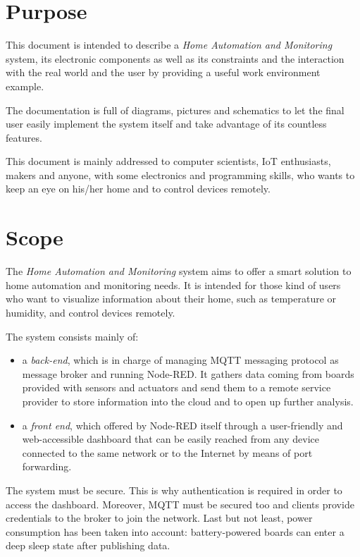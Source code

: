 \section{Purpose}
This document is intended to describe a \textit{Home Automation and Monitoring} system, its electronic components as well as its constraints and the interaction with the real world and the user by providing a useful work environment example.

The documentation is full of diagrams, pictures and schematics to let the final user easily implement the system itself and take advantage of its countless features.

This document is mainly addressed to computer scientists, IoT enthusiasts, makers and anyone, with some electronics and programming skills, who wants to keep an eye on his/her home and to control devices remotely.

\section{Scope}
The \textit{Home Automation and Monitoring} system aims to offer a smart solution to home automation and monitoring needs. It is intended for those kind of users who want to visualize information about their home, such as temperature or humidity, and control devices remotely.

The system consists mainly of:
\begin{itemize}
	\item a \textit{back-end}, which is in charge of managing MQTT messaging protocol as message broker and running Node-RED. It gathers data coming from boards provided with sensors and actuators and send them to a remote service provider to store information into the cloud and to open up further analysis.
	
	\item a \textit{front end}, which offered by Node-RED itself through a user-friendly and web-accessible dashboard that can be easily reached from any device connected to the same network or to the Internet by means of port forwarding.
\end{itemize}

\noindent
The system must be secure. This is why authentication is required in order to access the dashboard.
Moreover, MQTT must be secured too and clients provide credentials to the broker to join the network.
Last but not least, power consumption has been taken into account: battery-powered boards can enter a deep sleep state after publishing data.

